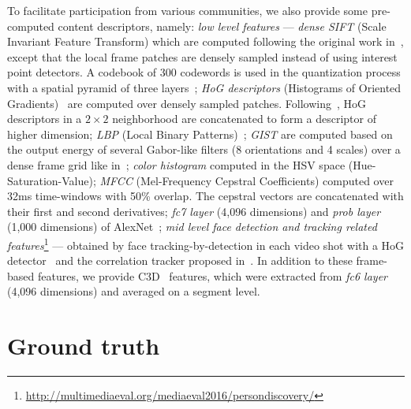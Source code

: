 \documentclass[sigconf]{acmart-me}
\begin{document}
To facilitate participation from various communities, we also
provide some pre-computed content descriptors, namely: \emph{low
level features} --- \emph{dense SIFT} (Scale Invariant Feature
Transform) which are computed following the original work
in~\cite{Lowe2004}, except that the local frame patches are densely
sampled instead of using interest point detectors. A codebook of 300
codewords is used in the quantization process with a spatial pyramid
of three layers~\cite{Lazebnik2006}; \emph{HoG descriptors}
(Histograms of Oriented Gradients)~\cite{Dalal2005} are computed
over densely sampled patches. Following~\cite{Xiao2010}, HoG
descriptors in a $2\times2$ neighborhood are concatenated to form a
descriptor of higher dimension; \emph{LBP} (Local Binary
Patterns)~\cite{Ojala2002}; \emph{GIST} are computed based on the
output energy of several Gabor-like filters (8 orientations and 4
scales) over a dense frame grid like in~\cite{Oliva2001};
\emph{color histogram} computed in the HSV space
(Hue-Saturation-Value); \emph{MFCC} (Mel-Frequency Cepstral
Coefficients) computed over 32ms time-windows with 50\%
overlap. The cepstral vectors are concatenated with their first and
second derivatives; \emph{fc7 layer} (4,096 dimensions) and
\emph{prob layer} (1,000 dimensions) of AlexNet~\cite{Jiang2015};
\emph{mid level face detection and tracking related
features}\footnote{\url{http://multimediaeval.org/mediaeval2016/persondiscovery/}}
--- obtained by face tracking-by-detection in each video shot with a
HoG detector~\cite{Dalal2005} and the correlation tracker proposed
in~\cite{Danelljan2014}. In addition to these frame-based features, we provide C3D~\cite{tran2015learning} features, which were extracted from \emph{fc6 layer} (4,096 dimensions) and averaged on a segment level.


\vspace{-0.2cm}
\section{Ground truth}
\end{document}
